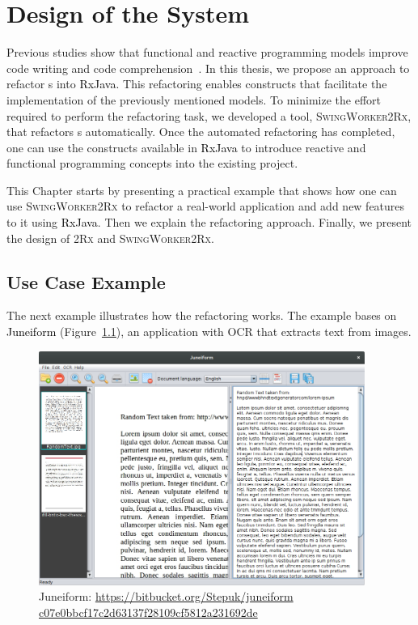 \documentclass[type=bsc,accentcolor=tud9c]{tudthesis}
\newcommand{\framework}[1]{\textcolor{black}{#1}}
\newcommand{\toolcore}{\textsc{2Rx}}
\newcommand{\toolextension}{\textsc{SwingWorker2Rx}}
\begin{document}
\chapter{Design of the System}
\label{chapter:design}

Previous studies show that functional and reactive programming models improve code writing and code comprehension~\cite{promises, paperReactiveComprehension}. In this thesis, we propose an approach to refactor s into \framework{RxJava}. This refactoring enables constructs that facilitate the implementation of the previously mentioned models. To minimize the effort required to perform the refactoring task, we developed a tool, \toolextension{}, that refactors s automatically. Once the automated refactoring has completed, one can use the constructs available in \framework{RxJava} to introduce reactive and functional programming concepts into the existing project.

This Chapter starts by presenting a practical example that shows how one can use \toolextension{} to refactor a real-world application and add new features to it using \framework{RxJava}. Then we explain the refactoring approach. Finally, we present the design of \toolcore{} and \toolextension{}.

\section{Use Case Example}

The next example illustrates how the refactoring works. The example bases on \framework{Juneiform} (Figure~\ref{fig:juneiform}), an application with OCR that extracts text from images.

\begin{figure}[h]
\begin{center}
\includegraphics[width=0.95\textwidth]{juneiform/Juneiform.png}
\caption{Juneiform: \url{https://bitbucket.org/Stepuk/juneiform}\\\href{https://bitbucket.org/Stepuk/juneiform/src/c07e0bbcf17c2d63137f28109cf5812a231692de?at=default}{c07e0bbcf17c2d63137f28109cf5812a231692de}}
\label{fig:juneiform}
\end{center}
\end{figure}
\end{document}
